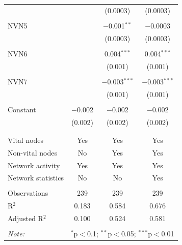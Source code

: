 \begin{table}[!htbp]
\begin{tabular}{@{\extracolsep{5pt}}lccc}
  &  & (0.0003) & (0.0003) \\ 
  & & & \\ 
 NVN5 &  & $-$0.001$^{**}$ & $-$0.0003 \\ 
  &  & (0.0003) & (0.0003) \\ 
  & & & \\ 
 NVN6 &  & 0.004$^{***}$ & 0.004$^{***}$ \\ 
  &  & (0.001) & (0.001) \\ 
  & & & \\ 
 NVN7 &  & $-$0.003$^{***}$ & $-$0.003$^{***}$ \\ 
  &  & (0.001) & (0.001) \\ 
  & & & \\ 
 Constant & $-$0.002 & $-$0.002 & $-$0.002 \\ 
  & (0.002) & (0.002) & (0.002) \\ 
  & & & \\ 
\hline \\[-1.8ex] 
Vital nodes & Yes & Yes & Yes \\ 
Non-vital nodes & No & Yes & Yes \\ 
Network activity & Yes & Yes & Yes \\ 
Network statistics & No & No & Yes \\ 
\hline &  &  &  \\ 
Observations & 239 & 239 & 239 \\ 
R$^{2}$ & 0.183 & 0.584 & 0.676 \\ 
Adjusted R$^{2}$ & 0.100 & 0.524 & 0.581 \\ 
\hline 
\hline \\[-1.8ex] 
\textit{Note:}  & \multicolumn{3}{r}{$^{*}$p$<$0.1; $^{**}$p$<$0.05; $^{***}$p$<$0.01} \\ 
\end{tabular} 
\end{table} 
